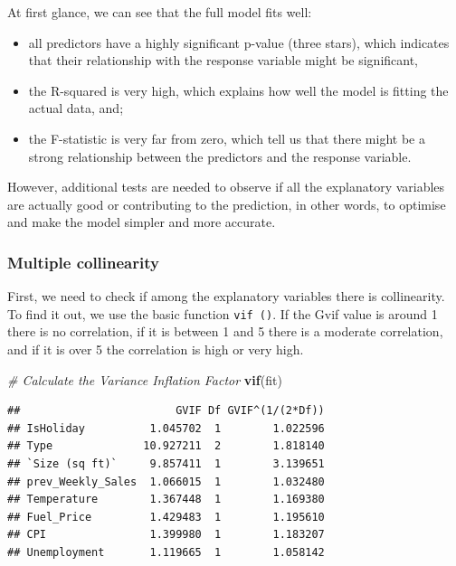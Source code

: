 \documentclass[11pt,]{article}
\newenvironment{Shaded}{\begin{snugshade}}{\end{snugshade}}
\newcommand{\KeywordTok}[1]{\textcolor[rgb]{0.13,0.29,0.53}{\textbf{{#1}}}}
\newcommand{\CommentTok}[1]{\textcolor[rgb]{0.56,0.35,0.01}{\textit{{#1}}}}
\newcommand{\NormalTok}[1]{{#1}}
\begin{document}
At first glance, we can see that the full model fits well:

\begin{itemize}
\item
  all predictors have a highly significant p-value (three stars), which
  indicates that their relationship with the response variable might be
  significant,
\item
  the R-squared is very high, which explains how well the model is
  fitting the actual data, and;
\item
  the F-statistic is very far from zero, which tell us that there might
  be a strong relationship between the predictors and the response
  variable.
\end{itemize}

However, additional tests are needed to observe if all the explanatory
variables are actually good or contributing to the prediction, in other
words, to optimise and make the model simpler and more accurate.

\subsubsection{Multiple collinearity}\label{multiple-collinearity}

First, we need to check if among the explanatory variables there is
collinearity. To find it out, we use the basic function
\texttt{vif\ ()}. If the Gvif value is around 1 there is no correlation,
if it is between 1 and 5 there is a moderate correlation, and if it is
over 5 the correlation is high or very high.

\begin{Shaded}
\begin{Highlighting}[]
\CommentTok{# Calculate the Variance Inflation Factor}
\KeywordTok{vif}\NormalTok{(fit)}
\end{Highlighting}
\end{Shaded}

\begin{verbatim}
##                        GVIF Df GVIF^(1/(2*Df))
## IsHoliday          1.045702  1        1.022596
## Type              10.927211  2        1.818140
## `Size (sq ft)`     9.857411  1        3.139651
## prev_Weekly_Sales  1.066015  1        1.032480
## Temperature        1.367448  1        1.169380
## Fuel_Price         1.429483  1        1.195610
## CPI                1.399980  1        1.183207
## Unemployment       1.119665  1        1.058142
\end{verbatim}
\end{document}
